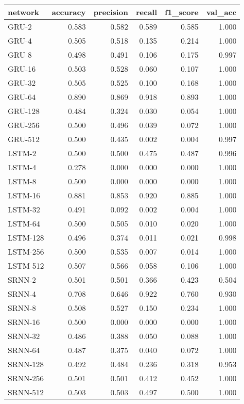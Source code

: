 \begin{tabular}{lrrrrr}
\toprule
  network &  accuracy &  precision &  recall &  f1\_score &  val\_acc \\
\midrule
    GRU-2 &     0.583 &      0.582 &   0.589 &     0.585 &    1.000 \\
    GRU-4 &     0.505 &      0.518 &   0.135 &     0.214 &    1.000 \\
    GRU-8 &     0.498 &      0.491 &   0.106 &     0.175 &    0.997 \\
   GRU-16 &     0.503 &      0.528 &   0.060 &     0.107 &    1.000 \\
   GRU-32 &     0.505 &      0.525 &   0.100 &     0.168 &    1.000 \\
   GRU-64 &     0.890 &      0.869 &   0.918 &     0.893 &    1.000 \\
  GRU-128 &     0.484 &      0.324 &   0.030 &     0.054 &    1.000 \\
  GRU-256 &     0.500 &      0.496 &   0.039 &     0.072 &    1.000 \\
  GRU-512 &     0.500 &      0.435 &   0.002 &     0.004 &    0.997 \\
   LSTM-2 &     0.500 &      0.500 &   0.475 &     0.487 &    0.996 \\
   LSTM-4 &     0.278 &      0.000 &   0.000 &     0.000 &    1.000 \\
   LSTM-8 &     0.500 &      0.000 &   0.000 &     0.000 &    1.000 \\
  LSTM-16 &     0.881 &      0.853 &   0.920 &     0.885 &    1.000 \\
  LSTM-32 &     0.491 &      0.092 &   0.002 &     0.004 &    1.000 \\
  LSTM-64 &     0.500 &      0.505 &   0.010 &     0.020 &    1.000 \\
 LSTM-128 &     0.496 &      0.374 &   0.011 &     0.021 &    0.998 \\
 LSTM-256 &     0.500 &      0.535 &   0.007 &     0.014 &    1.000 \\
 LSTM-512 &     0.507 &      0.566 &   0.058 &     0.106 &    1.000 \\
   SRNN-2 &     0.501 &      0.501 &   0.366 &     0.423 &    0.504 \\
   SRNN-4 &     0.708 &      0.646 &   0.922 &     0.760 &    0.930 \\
   SRNN-8 &     0.508 &      0.527 &   0.150 &     0.234 &    1.000 \\
  SRNN-16 &     0.500 &      0.000 &   0.000 &     0.000 &    1.000 \\
  SRNN-32 &     0.486 &      0.388 &   0.050 &     0.088 &    1.000 \\
  SRNN-64 &     0.487 &      0.375 &   0.040 &     0.072 &    1.000 \\
 SRNN-128 &     0.492 &      0.484 &   0.236 &     0.318 &    0.953 \\
 SRNN-256 &     0.501 &      0.501 &   0.412 &     0.452 &    1.000 \\
 SRNN-512 &     0.503 &      0.503 &   0.497 &     0.500 &    1.000 \\
\bottomrule
\end{tabular}

